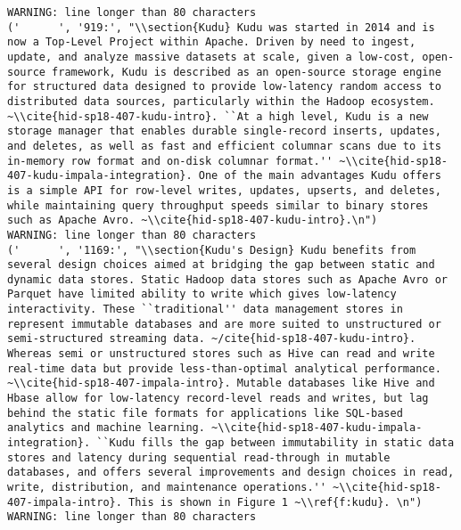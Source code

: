 \begin{tiny}
\begin{verbatim}
WARNING: line longer than 80 characters
('      ', '919:', "\\section{Kudu} Kudu was started in 2014 and is now a Top-Level Project within Apache. Driven by need to ingest, update, and analyze massive datasets at scale, given a low-cost, open-source framework, Kudu is described as an open-source storage engine for structured data designed to provide low-latency random access to distributed data sources, particularly within the Hadoop ecosystem. ~\\cite{hid-sp18-407-kudu-intro}. ``At a high level, Kudu is a new storage manager that enables durable single-record inserts, updates, and deletes, as well as fast and efficient columnar scans due to its in-memory row format and on-disk columnar format.'' ~\\cite{hid-sp18-407-kudu-impala-integration}. One of the main advantages Kudu offers is a simple API for row-level writes, updates, upserts, and deletes, while maintaining query throughput speeds similar to binary stores such as Apache Avro. ~\\cite{hid-sp18-407-kudu-intro}.\n")
WARNING: line longer than 80 characters
('      ', '1169:', "\\section{Kudu's Design} Kudu benefits from several design choices aimed at bridging the gap between static and dynamic data stores. Static Hadoop data stores such as Apache Avro or Parquet have limited ability to write which gives low-latency interactivity. These ``traditional'' data management stores in represent immutable databases and are more suited to unstructured or semi-structured streaming data. ~/cite{hid-sp18-407-kudu-intro}. Whereas semi or unstructured stores such as Hive can read and write real-time data but provide less-than-optimal analytical performance. ~\\cite{hid-sp18-407-impala-intro}. Mutable databases like Hive and Hbase allow for low-latency record-level reads and writes, but lag behind the static file formats for applications like SQL-based analytics and machine learning. ~\\cite{hid-sp18-407-kudu-impala-integration}. ``Kudu fills the gap between immutability in static data stores and latency during sequential read-through in mutable databases, and offers several improvements and design choices in read, write, distribution, and maintenance operations.'' ~\\cite{hid-sp18-407-impala-intro}. This is shown in Figure 1 ~\\ref{f:kudu}. \n")
WARNING: line longer than 80 characters

\end{verbatim}
\end{tiny}
